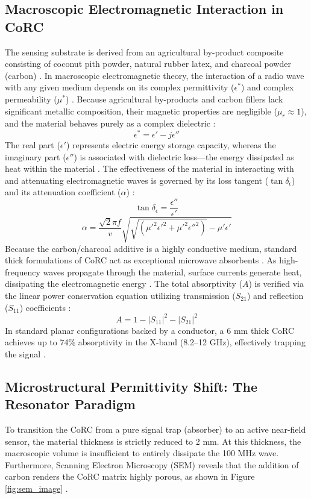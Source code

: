 \documentclass[11pt, a4paper]{article}
\begin{document}
\subsection{Macroscopic Electromagnetic Interaction in CoRC}
The sensing substrate is derived from an agricultural by-product composite consisting of coconut pith powder, natural rubber latex, and charcoal powder (carbon) \cite{b7}. In macroscopic electromagnetic theory, the interaction of a radio wave with any given medium depends on its complex permittivity ($\epsilon^*$) and complex permeability ($\mu^*$) \cite{b8}. Because agricultural by-products and carbon fillers lack significant metallic composition, their magnetic properties are negligible ($\mu_r \approx 1$), and the material behaves purely as a complex dielectric \cite{b8}:
\begin{equation}
    \epsilon^* = \epsilon' - j\epsilon''
\end{equation}
The real part ($\epsilon'$) represents electric energy storage capacity, whereas the imaginary part ($\epsilon''$) is associated with dielectric loss---the energy dissipated as heat within the material \cite{b8}. The effectiveness of the material in interacting with and attenuating electromagnetic waves is governed by its loss tangent ($\tan \delta_\epsilon$) and its attenuation coefficient ($\alpha$) \cite{b8}:
\begin{equation}
    \tan \delta_\epsilon = \frac{\epsilon''}{\epsilon'}
\end{equation}
\begin{equation}
    \alpha = \frac{\sqrt{2}\pi f}{v} \sqrt{\sqrt{({\mu'}^2{\epsilon'}^2 + {\mu'}^2{\epsilon''}^2)} - \mu'\epsilon'}
\end{equation}
Because the carbon/charcoal additive is a highly conductive medium, standard thick formulations of CoRC act as exceptional microwave absorbents \cite{b1}. As high-frequency waves propagate through the material, surface currents generate heat, dissipating the electromagnetic energy \cite{b1}. The total absorptivity ($A$) is verified via the linear power conservation equation utilizing transmission ($S_{21}$) and reflection ($S_{11}$) coefficients \cite{b1}:
\begin{equation}
    A = 1 - |S_{11}|^2 - |S_{21}|^2
\end{equation}
In standard planar configurations backed by a conductor, a 6 mm thick CoRC achieves up to 74\% absorptivity in the X-band (8.2–12 GHz), effectively trapping the signal \cite{b1}. 

\subsection{Microstructural Permittivity Shift: The Resonator Paradigm}
To transition the CoRC from a pure signal trap (absorber) to an active near-field sensor, the material thickness is strictly reduced to 2 mm. At this thickness, the macroscopic volume is insufficient to entirely dissipate the 100 MHz wave. Furthermore, Scanning Electron Microscopy (SEM) reveals that the addition of carbon renders the CoRC matrix highly porous, as shown in Figure \ref{fig:sem_image} \cite{b1}. 
\end{document}
